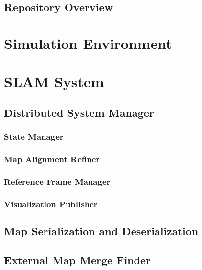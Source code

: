 \subsection{Repository Overview}
\label{sec:repository-overview}

\section{Simulation Environment}
\label{sec:simulation-environment}

\section{SLAM System}
\label{sec:slam-system}

\subsection{Distributed System Manager}
\label{sec:distributed-system-manager}

\subsubsection{State Manager}
\label{sec:state-manager}

\subsubsection{Map Alignment Refiner}
\label{sec:map-alignment-refiner}

\subsubsection{Reference Frame Manager}
\label{sec:reference-frame-manager}

\subsubsection{Visualization Publisher}
\label{sec:visualization-publisher}

\subsection{Map Serialization and Deserialization}
\label{sec:map-serialization-and-deserialization}

\subsection{External Map Merge Finder}
\label{sec:external-map-merge-finder}

